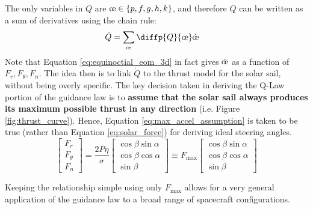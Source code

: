 The only variables in \(Q\) are \(\moe \in \{p, f, g, h, k\}\), and therefore \(Q\) can be written as a sum of derivatives using the chain rule:
\begin{align*}
    \dot{Q} & = \sum_{\moe} \diffp{Q}{{\moe}} \dot{\moe}
\end{align*}
Note that Equation \ref{eq:equinoctial_eom_3d} in fact gives \(\dot{\moe}\) as a function of \(F_r, F_\theta, F_n\). The idea then is to link \(\dot{Q}\) to the thrust model for the solar sail, without being overly specific. The key decision taken in deriving the Q-Law portion of the guidance law is to \textbf{assume that the solar sail always produces its maximum possible thrust in any direction} (i.e. Figure \ref{fig:thrust_curve}). Hence, Equation \ref{eq:max_accel_assumption} is taken to be true (rather than Equation \ref{eq:solar_force}) for deriving ideal steering angles.
\begin{equation}
    \begin{bmatrix}
        F_r      \\
        F_\theta \\
        F_n
    \end{bmatrix} =
    \frac{2P\eta}{\sigma}
    \begin{bmatrix}
        \cos \beta \sin \alpha \\
        \cos \beta \cos \alpha \\
        \sin \beta
    \end{bmatrix}
    \equiv
    F_{\max}
    \begin{bmatrix}
        \cos \beta \sin \alpha \\
        \cos \beta \cos \alpha \\
        \sin \beta
    \end{bmatrix}
    \label{eq:max_accel_assumption}
\end{equation}

Keeping the relationship simple using only \(F_{\max}\) allows for a very general application of the guidance law to a broad range of spacecraft configurations.

